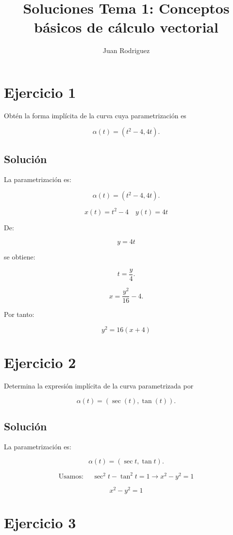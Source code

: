 \documentclass[11pt,a4paper]{article}
\title{Soluciones Tema 1: Conceptos básicos de cálculo vectorial}
\author{Juan Rodriguez}
\date{}
\begin{document}
\maketitle

\section{Ejercicio 1}

Obtén la forma implícita de la curva cuya parametrización es

\[
\alpha(t)=(t^2-4,4t).
\]

\subsection{Solución}

La parametrización es:

\[
\alpha(t)=(t^2-4,4t).
\]

\[
x(t) = t^2-4 \quad y(t) = 4t 
\]

De:

\[
y=4t
\]

se obtiene:

\[
t=\frac{y}{4}.
\]

\[
x=\frac{y^2}{16}-4.
\]

Por tanto:

\[
\boxed{y^2=16(x+4)}
\]

\section{Ejercicio 2}

Determina la expresión implícita de la curva parametrizada por

\[
\alpha(t)=(\sec(t),\tan(t)).
\]

\subsection{Solución}

La parametrización es:

\[
\alpha(t)=(\sec t,\tan t).
\]

\[
\text{Usamos: } \quad \boxed{\sec^2t-\tan^2t=1} \rightarrow x^2-y^2=1
\]

\[
\boxed{x^2-y^2=1}
\]

\section{Ejercicio 3}
\end{document}
